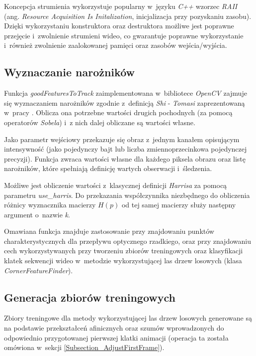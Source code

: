       Koncepcja strumienia wykorzystuje popularny w~języku \textit{C++} wzorzec \textit{RAII} (ang. \textit{Resource Acquisition Is Initalization}, inicjalizacja przy pozyskaniu zasobu). Dzięki wykorzystaniu konstruktora oraz destruktora możliwe jest poprawne przejęcie i~zwolnienie strumieni wideo, co gwarantuje poprawne wykorzystanie i~również zwolnienie zaalokowanej pamięci oraz zasobów wejścia/wyjścia.

    \subsection{Wyznaczanie narożników}

      Funkcja \textit{goodFeaturesToTrack} zaimplementowana w~bibliotece \textit{OpenCV} zajmuje się wyznaczaniem narożników zgodnie z~definicją \textit{Shi} - \textit{Tomasi} zaprezentowaną w~pracy \cite{GoodFeaturesToTrack94}. Oblicza ona potrzebne wartości drugich pochodnych (za pomocą operatorów \textit{Sobela}) i~z nich dalej obliczane są wartości własne.

      Jako parametr wejściowy przekazuje się obraz z~jednym kanałem opisującym intensywność (jako pojedynczy bajt lub liczba zmiennoprzecinkowa pojedynczej precyzji). Funkcja zwraca wartości własne dla każdego piksela obrazu oraz listę narożników, które spełniają definicję wartych obserwacji i~śledzenia.

      Możliwe jest obliczenie wartości z~klasycznej definicji \textit{Harrisa} za pomocą parametru \textit{use\_harris}. Do przekazania współczynnika niezbędnego do obliczenia różnicy wyznacznika macierzy $H(p)$ od tej samej macierzy służy następny argument o~nazwie \textit{k}.

      Omawiana funkcja znajduje zastosowanie przy znajdowaniu punktów charakterystycznych dla przepływu optycznego rzadkiego, oraz przy znajdowaniu cech wykorzystywanych przy tworzeniu zbiorów treningowych oraz klasyfikacji klatek sekwencji wideo w~metodzie wykorzystującej las drzew losowych (klasa \textit{CornerFeatureFinder}).

    \subsection{Generacja zbiorów treningowych}

      Zbiory treningowe dla metody wykorzystującej las drzew losowych generowane są na podstawie przekształceń afinicznych oraz szumów wprowadzonych do odpowiednio przygotowanej pierwszej klatki animacji (operacja ta została omówiona w~sekcji \ref{Subsection_AdjustFirstFrame}).

